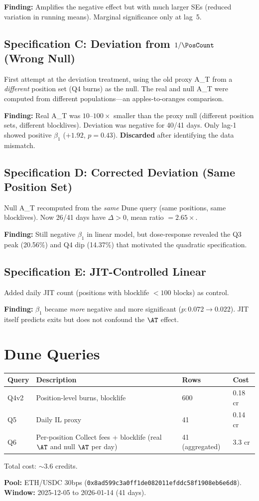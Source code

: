 \textbf{Finding:} Amplifies the negative effect but with much larger SEs
(reduced variation in running means). Marginal significance only at lag~5.

\subsection{Specification C: Deviation from $1/\PosCount$ (Wrong Null)}

First attempt at the deviation treatment, using the old proxy A\_T from a
\emph{different} position set (Q4 burns) as the null. The real and null A\_T
were computed from different populations---an apples-to-oranges comparison.

\textbf{Finding:} Real A\_T was $10$--$100\times$ smaller than the proxy null
(different position sets, different blocklives). Deviation was negative for
40/41 days. Only lag-1 showed positive $\beta_1$ ($+1.92$, $p = 0.43$).
\textbf{Discarded} after identifying the data mismatch.

\subsection{Specification D: Corrected Deviation (Same Position Set)}

Null A\_T recomputed from the \emph{same} Dune query (same positions, same
blocklives). Now 26/41 days have $\Delta > 0$, mean ratio $= 2.65\times$.

\textbf{Finding:} Still negative $\beta_1$ in linear model, but dose-response
revealed the Q3 peak (20.56\%) and Q4 dip (14.37\%) that motivated the
quadratic specification.

\subsection{Specification E: JIT-Controlled Linear}

Added daily JIT count (positions with blocklife $< 100$ blocks) as control.

\textbf{Finding:} $\beta_1$ became \emph{more} negative and more significant
($p: 0.072 \to 0.022$). JIT itself predicts exits but does not confound the
$\AT$ effect.

\section{Dune Queries}\label{app:queries}

\begin{center}
\begin{tabular}{@{}llll@{}}
\toprule
Query & Description & Rows & Cost \\
\midrule
Q4v2 & Position-level burns, blocklife & 600 & 0.18 cr \\
Q5 & Daily IL proxy & 41 & 0.14 cr \\
Q6 & Per-position Collect fees + blocklife (real $\AT$ and null $\AT$ per day)
  & 41 (aggregated) & 3.3 cr \\
\bottomrule
\end{tabular}
\end{center}

Total cost: ${\sim}3.6$ credits.

\textbf{Pool:} ETH/USDC 30bps (\texttt{0x8ad599c3a0ff1de082011efddc58f1908eb6e6d8}).\\
\textbf{Window:} 2025-12-05 to 2026-01-14 (41 days).
